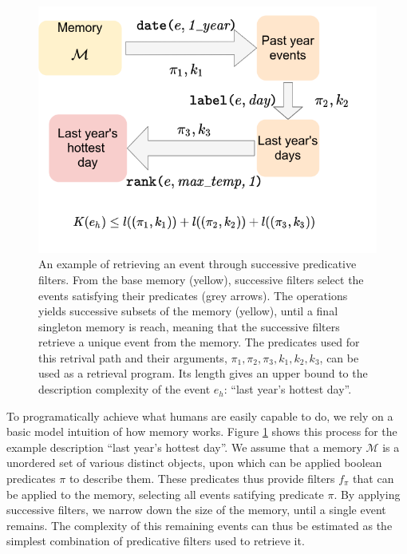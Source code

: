 \documentclass[conference]{IEEEtran}
\begin{document}

\begin{figure}[ht]
  \centering
  \includegraphics[width=\linewidth]{figures/filters}
  \caption{An example of retrieving an event through successive predicative
    filters. From the base memory (yellow), successive filters select the events
    satisfying their predicates (grey arrows). The operations yields successive
    subsets of the memory (yellow), until a final singleton memory is reach,
    meaning that the successive filters retrieve a unique event from the memory.
    The predicates used for this retrival path and their arguments,
    $\pi_{1}, \pi_{2}, \pi_{3}, k_{1}, k_{2}, k_{3}$, can be used as a retrieval
    program. Its length gives an upper bound to the description complexity of
    the event $e_{h}$: ``last year's hottest day''.}
  \label{fig:filters}
\end{figure}

To programatically achieve what humans are easily capable to do, we rely on a
basic model intuition of how memory works. Figure \ref{fig:filters} shows this
process for the example description ``last year's hottest day''. We assume that
a memory $\mathcal{M}$ is a unordered set of various distinct objects, upon
which can be applied boolean predicates $\pi$ to describe them. These predicates thus
provide filters $f_{\pi}$ that can be applied to the memory, selecting all events
satifying predicate $\pi$. By applying successive
filters, we narrow down the size of the memory, until a single event remains.
The complexity of this remaining events can thus be estimated as the simplest
combination of predicative filters used to retrieve it.
\end{document}
